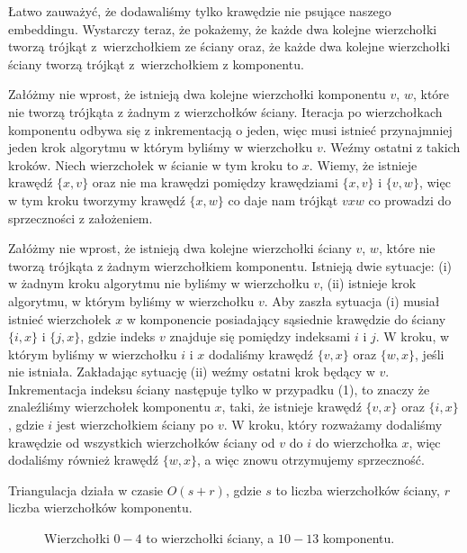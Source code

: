 \documentclass[twoside,a4paper,12pt]{report} %
\theoremstyle{break}
\begin{document}
Łatwo zauważyć, że dodawaliśmy tylko krawędzie nie psujące naszego embeddingu. Wystarczy teraz, że pokażemy, że każde dwa kolejne wierzchołki tworzą trójkąt z~wierzchołkiem ze ściany oraz, że każde dwa kolejne wierzchołki ściany tworzą trójkąt z~wierzchołkiem z komponentu.

Załóżmy nie wprost, że istnieją dwa kolejne wierzchołki komponentu $v$, $w$, które nie tworzą trójkąta z żadnym z wierzchołków ściany. Iteracja po wierzchołkach komponentu odbywa się z inkrementacją o jeden, więc musi istnieć przynajmniej jeden krok algorytmu w którym byliśmy w wierzchołku $v$. Weźmy ostatni z takich kroków. Niech wierzchołek w ścianie w tym kroku to $x$. Wiemy, że istnieje krawędź $\{x,v\}$ oraz nie ma krawędzi pomiędzy krawędziami $\{x,v\}$ i $\{v,w\}$, więc w tym kroku tworzymy krawędź $\{x,w\}$ co daje nam trójkąt $vxw$ co prowadzi do sprzeczności z założeniem.

Załóżmy nie wprost, że istnieją dwa kolejne wierzchołki ściany $v$, $w$, które nie tworzą trójkąta z żadnym wierzchołkiem komponentu. Istnieją dwie sytuacje: (i) w żadnym kroku algorytmu nie byliśmy w wierzchołku $v$, (ii) istnieje krok algorytmu, w którym byliśmy w wierzchołku $v$. Aby zaszła sytuacja (i) musiał istnieć wierzchołek $x$ w komponencie posiadający sąsiednie krawędzie do ściany $\{i,x\}$ i $\{j,x\}$, gdzie indeks $v$ znajduje się pomiędzy indeksami $i$ i $j$. W kroku, w którym byliśmy w wierzchołku $i$ i $x$ dodaliśmy krawędź $\{v,x\}$ oraz $\{w,x\}$, jeśli nie istniała. Zakładając sytuację (ii) weźmy ostatni krok będący w $v$. Inkrementacja indeksu ściany następuje tylko w przypadku (1), to znaczy że znaleźliśmy wierzchołek komponentu $x$, taki, że istnieje krawędź $\{v,x\}$ oraz $\{i,x\}$, gdzie $i$ jest wierzchołkiem ściany po $v$. W kroku, który rozważamy dodaliśmy krawędzie od wszystkich wierzchołków ściany od $v$ do $i$ do wierzchołka $x$, więc dodaliśmy również krawędź $\{w,x\}$, a więc znowu otrzymujemy sprzeczność.

Triangulacja działa w czasie $O(s+r)$, gdzie $s$ to liczba wierzchołków ściany, $r$ liczba wierzchołków komponentu.

\begin{figure}[ht]
    \centering
    
    \caption{Wierzchołki $0-4$ to wierzchołki ściany, a $10-13$ komponentu.}
    \label{triangulacja}
\end{figure}
\end{document}
